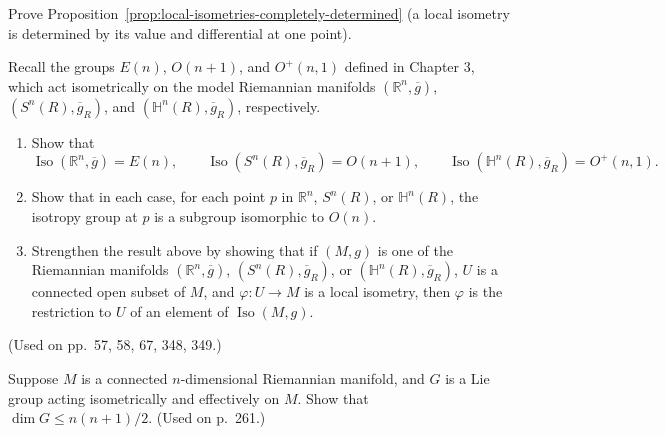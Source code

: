 \begin{exercise}
\label{prob:local-isometry-determined-point}

Prove Proposition~\ref{prop:local-isometries-completely-determined} (a local isometry is determined by its value and differential at one point).
\end{exercise}

\begin{exercise}
\label{prob:model-manifolds-isometric-actions}

Recall the groups $E(n)$, $O(n+1)$, and $O^+(n,1)$ defined in Chapter 3, which act isometrically on the model Riemannian manifolds $(\mathbb{R}^n, \overline{g})$, $(S^n(R), \overline{g}_R)$, and $(\mathbb{H}^n(R), \overline{g}_R)$, respectively.
\begin{enumerate}
\item[(a)] Show that
\[
\operatorname{Iso}(\mathbb{R}^n,\overline{g}) = E(n), \qquad
\operatorname{Iso}(S^n(R),\overline{g}_R) = O(n+1), \qquad
\operatorname{Iso}(\mathbb{H}^n(R),\overline{g}_R) = O^+(n,1).
\]
\item[(b)] Show that in each case, for each point $p$ in $\mathbb{R}^n$, $S^n(R)$, or $\mathbb{H}^n(R)$, the isotropy group at $p$ is a subgroup isomorphic to $O(n)$.
\item[(c)] Strengthen the result above by showing that if $(M,g)$ is one of the Riemannian manifolds $(\mathbb{R}^n,\overline{g})$, $(S^n(R),\overline{g}_R)$, or $(\mathbb{H}^n(R),\overline{g}_R)$, $U$ is a connected open subset of $M$, and $\varphi: U \to M$ is a local isometry, then $\varphi$ is the restriction to $U$ of an element of $\operatorname{Iso}(M,g)$.
\end{enumerate}
(Used on pp.\ 57, 58, 67, 348, 349.)
\end{exercise}

\begin{exercise}
\label{prob:lie-group-dimension-bound}

Suppose $M$ is a connected $n$-dimensional Riemannian manifold, and $G$ is a Lie group acting isometrically and effectively on $M$. Show that $\dim G \leq n(n+1)/2$. (Used on p.\ 261.)
\end{exercise}

